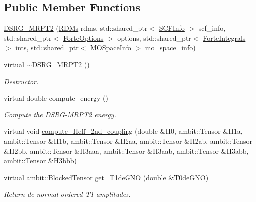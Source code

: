 \subsection*{Public Member Functions}
\begin{DoxyCompactItemize}
\item 
\mbox{\hyperlink{classforte_1_1_d_s_r_g___m_r_p_t2_a0e418cbcf42c1e36c77b6866e243aeb6}{D\+S\+R\+G\+\_\+\+M\+R\+P\+T2}} (\mbox{\hyperlink{classforte_1_1_r_d_ms}{R\+D\+Ms}} rdms, std\+::shared\+\_\+ptr$<$ \mbox{\hyperlink{classforte_1_1_s_c_f_info}{S\+C\+F\+Info}} $>$ scf\+\_\+info, std\+::shared\+\_\+ptr$<$ \mbox{\hyperlink{classforte_1_1_forte_options}{Forte\+Options}} $>$ options, std\+::shared\+\_\+ptr$<$ \mbox{\hyperlink{classforte_1_1_forte_integrals}{Forte\+Integrals}} $>$ ints, std\+::shared\+\_\+ptr$<$ \mbox{\hyperlink{classforte_1_1_m_o_space_info}{M\+O\+Space\+Info}} $>$ mo\+\_\+space\+\_\+info)
\item 
virtual \mbox{\hyperlink{classforte_1_1_d_s_r_g___m_r_p_t2_a5d3cf5ee234684e911d90de497aa868b}{$\sim$\+D\+S\+R\+G\+\_\+\+M\+R\+P\+T2}} ()
\begin{DoxyCompactList}\small\item\em Destructor. \end{DoxyCompactList}\item 
virtual double \mbox{\hyperlink{classforte_1_1_d_s_r_g___m_r_p_t2_a0884f1a9e8f98eb3c272e9c6518e7691}{compute\+\_\+energy}} ()
\begin{DoxyCompactList}\small\item\em Compute the D\+S\+R\+G-\/\+M\+R\+P\+T2 energy. \end{DoxyCompactList}\item 
virtual void \mbox{\hyperlink{classforte_1_1_d_s_r_g___m_r_p_t2_a739972fe0720c3a9881c1bd039fedb11}{compute\+\_\+\+Heff\+\_\+2nd\+\_\+coupling}} (double \&H0, ambit\+::\+Tensor \&H1a, ambit\+::\+Tensor \&H1b, ambit\+::\+Tensor \&H2aa, ambit\+::\+Tensor \&H2ab, ambit\+::\+Tensor \&H2bb, ambit\+::\+Tensor \&H3aaa, ambit\+::\+Tensor \&H3aab, ambit\+::\+Tensor \&H3abb, ambit\+::\+Tensor \&H3bbb)
\item 
virtual ambit\+::\+Blocked\+Tensor \mbox{\hyperlink{classforte_1_1_d_s_r_g___m_r_p_t2_a3811b3a31c76af9a94621c2b13213443}{get\+\_\+\+T1de\+G\+NO}} (double \&T0de\+G\+NO)
\begin{DoxyCompactList}\small\item\em Return de-\/normal-\/ordered T1 amplitudes. \end{DoxyCompactList}\item 

\end{DoxyCompactItemize}
